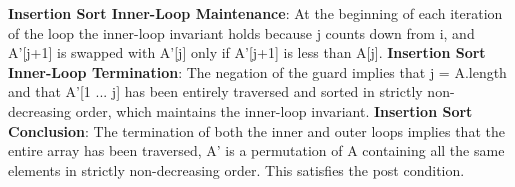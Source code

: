 \documentclass[onecolumn, 12pt, article]{IEEEtran}
\numberwithin{case}{problem}
\numberwithin{condition}{problem}
\numberwithin{condition}{subsection}
\numberwithin{definition}{section}
\theoremstyle{remark}
\numberwithin{question}{problem}
\theoremstyle{plain}
\numberwithin{answer}{problem}
\numberwithin{solution}{section}
\numberwithin{equation}{section}%
\begin{document}
\newline
\textbf{Insertion Sort Inner-Loop Maintenance}: At the beginning of each iteration of the loop the inner-loop invariant holds because j counts down from i, and A'[j+1] is swapped with A'[j] only if A'[j+1] is less than A[j].
\newline
\textbf{Insertion Sort Inner-Loop Termination}: The negation of the guard implies that j = A.length and that A'[1 ... j] has been entirely traversed and sorted in strictly non-decreasing order, which maintains the inner-loop invariant. 
\newline
\newline
\textbf{Insertion Sort Conclusion}: The termination of both the inner and outer loops implies that the entire array has been traversed, A' is a permutation of A containing all the same elements in strictly non-decreasing order. This satisfies the post condition.
\newline
\newline
\end{document}
